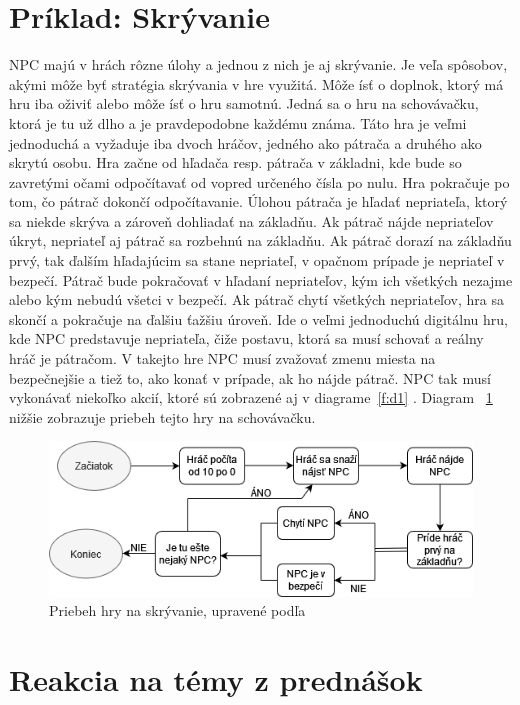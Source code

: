 \documentclass[10pt,twoside,slovak,a4paper]{article}
\begin{document}
\section{Príklad: Skrývanie} 
\quad NPC majú v hrách rôzne úlohy a jednou z nich je aj skrývanie. Je veľa spôsobov, akými môže byť stratégia skrývania v hre využitá. Môže ísť o doplnok, ktorý má hru iba oživiť alebo môže ísť o hru samotnú. Jedná sa o hru na schovávačku, ktorá je tu už dlho a je pravdepodobne každému známa. Táto hra je veľmi jednoduchá a vyžaduje iba dvoch hráčov, jedného ako pátrača a druhého ako skrytú osobu. Hra začne od hľadača resp. pátrača v základni, kde bude so zavretými očami odpočítavať od vopred určeného čísla po nulu. Hra pokračuje po tom, čo pátrač dokončí odpočítavanie. Úlohou pátrača je hľadať nepriateľa, ktorý sa niekde skrýva a zároveň dohliadať na základňu. Ak pátrač nájde nepriateľov úkryt, nepriateľ aj pátrač sa rozbehnú na základňu. Ak pátrač dorazí na základňu prvý, tak ďalším hľadajúcim sa stane nepriateľ, v opačnom prípade je nepriateľ v bezpečí. Pátrač bude pokračovať v hľadaní nepriateľov, kým ich všetkých nezajme alebo kým nebudú všetci v bezpečí. Ak pátrač chytí všetkých nepriateľov, hra sa skončí a pokračuje na ďalšiu ťažšiu úroveň.  \cite{NPC}  Ide o veľmi jednoduchú digitálnu hru, kde NPC predstavuje nepriateľa, čiže postavu, ktorá sa musí schovať a reálny hráč je pátračom. V takejto hre NPC musí zvažovať zmenu miesta na bezpečnejšie a tiež to, ako konať v prípade, ak ho nájde pátrač. NPC tak musí vykonávať niekoľko akcií, ktoré sú zobrazené aj v diagrame~\ref{f:d1} . Diagram ~\ref{f:d2} nižšie zobrazuje priebeh tejto hry na schovávačku. 
\begin{figure}[tbh]
\center\includegraphics[scale=0.5]{diagram2.png}
\caption{Priebeh hry na skrývanie, upravené podľa \cite{NPC}} 
\label{f:d2} 
\end{figure}


\section{Reakcia na témy z prednášok} 
\end{document}
